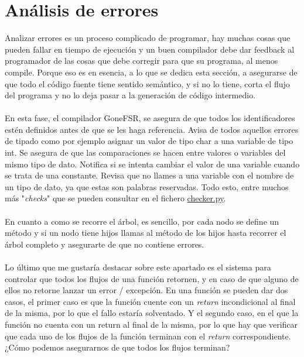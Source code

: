 \section{Análisis de errores}
Analizar errores es un proceso complicado de programar, hay muchas cosas que pueden fallar en tiempo de ejecución y un buen compilador debe dar feedback al programador de las cosas que debe corregir para que su programa, al menos compile. Porque eso es en esencia, a lo que se dedica esta sección, a asegurarse de que todo el código fuente tiene sentido semántico, y si no lo tiene, corta el flujo del programa y no lo deja pasar a la generación de código intermedio.  \\\\
En esta fase, el compilador GoneFSR, se asegura de que todos los identificadores estén definidos antes de que se les haga referencia. Avisa de todos aquellos errores de tipado como por ejemplo asignar un valor de tipo char a una variable de tipo int. Se asegura de que las comparaciones se hacen entre valores o variables del mismo tipo de dato. Notifica si se intenta cambiar el valor de una variable cuando se trata de una constante. Revisa que no llames a una variable con el nombre de un tipo de dato, ya que estas son palabras reservadas. Todo esto, entre muchos más "\textit{checks}" que se pueden consultar en el fichero \href{https://github.com/domingoUnican/TFGPedroCastro/blob/main/code/compilerGoneFSR/gone/checker.py}{checker.py}.
\\\\
En cuanto a como se recorre el árbol, es sencillo, por cada nodo se define un método y si un nodo tiene hijos llamas al método de los hijos hasta recorrer el árbol completo y asegurarte de que no contiene errores.\\\\
Lo último que me gustaría destacar sobre este apartado es el sistema para controlar que todos los flujos de una función retornen, y en caso de que alguno de ellos no retorne lanzar un error / excepción. En una función se pueden dar dos casos, el primer caso es que la función cuente con un \textit{return} incondicional al final de la misma, por lo que el fallo estaría solventado. Y el segundo caso, en el que la función no cuenta con un return al final de la misma, por lo que hay que verificar que cada uno de los flujos de la función terminan con el \textit{return} correspondiente. ¿Cómo podemos asegurarnos de que todos los flujos terminan? \\\\ 
